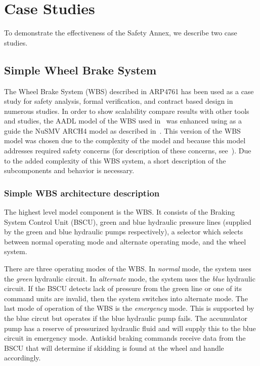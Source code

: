  \section{Case Studies}
\label{sec:case_study}
To demonstrate the effectiveness of the Safety Annex, we describe two case studies.  



\iffalse
\subsection{Simple Wheel Brake System}
The Wheel Brake System (WBS) described in ARP4761 has been used as a case study for safety analysis, formal verification, and contract based design in numerous studies. In order to show scalability compare results with other tools and studies, the AADL model of the WBS used in~\cite{Stewart17:IMBSA} was enhanced using as a guide the NuSMV ARCH4 model as described in~\cite{DBLP:conf/cav/BozzanoCPJKPRT15}. This version of the WBS model was chosen due to the complexity of the model and because this model addresses required safety concerns (for description of these concerns, see~\cite{DBLP:conf/cav/BozzanoCPJKPRT15}). Due to the added complexity of this WBS system, a short description of the subcomponents and behavior is necessary. 

\subsubsection{Simple WBS architecture description}
The highest level model component is the WBS. It consists of the Braking System Control Unit (BSCU), green and blue hydraulic pressure lines (supplied by the green and blue hydraulic pumps respectively), a selector which selects between normal operating mode and alternate operating mode, and the wheel system. 

There are three operating modes of the WBS. In \textit{normal} mode, the system uses the \textit{green} hydraulic circuit. In \textit{alternate} mode, the system uses the \textit{blue} hydraulic circuit.  If the BSCU detects lack of pressure from the green line or one of its command units are invalid, then the system switches into alternate mode. The last mode of operation of the WBS is the \textit{emergency} mode. This is supported by the blue circut but operates if the blue hydraulic pump fails. The accumulator pump has a reserve of pressurized hydraulic fluid and will supply this to the blue circuit in emergency mode.  Antiskid braking commands receive data from the BSCU that will determine if skidding is found at the wheel and handle accordingly. 

